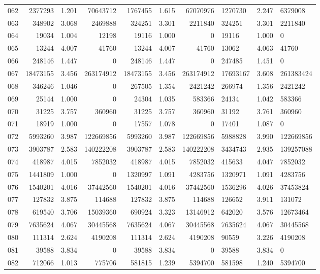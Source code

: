 \begin{longtable}{crrrrrr}
062 & 2377293 & 1.201 & 70643712 & 1767455 & 1.615 & 67070976 & 1270730 & 2.247 & 6379008 \\
063 & 348902 & 3.068 & 2469888 & 324251 & 3.301 & 2211840 & 324251 & 3.301 & 2211840 \\
064 & 19034 & 1.004 & 12198 & 19116 & 1.000 & 0 & 19116 & 1.000 & 0 \\
065 & 13244 & 4.007 & 41760 & 13244 & 4.007 & 41760 & 13062 & 4.063 & 41760 \\
066 & 248146 & 1.447 & 0 & 248146 & 1.447 & 0 & 247485 & 1.451 & 0 \\
067 & 18473155 & 3.456 & 263174912 & 18473155 & 3.456 & 263174912 & 17693167 & 3.608 & 261383424 \\
068 & 346246 & 1.046 & 0 & 267505 & 1.354 & 2421242 & 266974 & 1.356 & 2421242 \\
069 & 25144 & 1.000 & 0 & 24304 & 1.035 & 583366 & 24134 & 1.042 & 583366 \\
070 & 31225 & 3.757 & 360960 & 31225 & 3.757 & 360960 & 31192 & 3.761 & 360960 \\
071 & 18919 & 1.000 & 0 & 17557 & 1.078 & 0 & 17401 & 1.087 & 0 \\
072 & 5993260 & 3.987 & 122669856 & 5993260 & 3.987 & 122669856 & 5988828 & 3.990 & 122669856 \\
073 & 3903787 & 2.583 & 140222208 & 3903787 & 2.583 & 140222208 & 3434743 & 2.935 & 139257088 \\
074 & 418987 & 4.015 & 7852032 & 418987 & 4.015 & 7852032 & 415633 & 4.047 & 7852032 \\
075 & 1441809 & 1.000 & 0 & 1320997 & 1.091 & 4283756 & 1320971 & 1.091 & 4283756 \\
076 & 1540201 & 4.016 & 37442560 & 1540201 & 4.016 & 37442560 & 1536296 & 4.026 & 37453824 \\
077 & 127832 & 3.875 & 114688 & 127832 & 3.875 & 114688 & 126652 & 3.911 & 131072 \\
078 & 619540 & 3.706 & 15039360 & 690924 & 3.323 & 13146912 & 642020 & 3.576 & 12673464 \\
079 & 7635624 & 4.067 & 30445568 & 7635624 & 4.067 & 30445568 & 7635624 & 4.067 & 30445568 \\
080 & 111314 & 2.624 & 4190208 & 111314 & 2.624 & 4190208 & 90559 & 3.226 & 4190208 \\
081 & 39588 & 3.834 & 0 & 39588 & 3.834 & 0 & 39588 & 3.834 & 0 \\
082 & 712066 & 1.013 & 775706 & 581815 & 1.239 & 5394700 & 581598 & 1.240 & 5394700 \\

\end{longtable}
